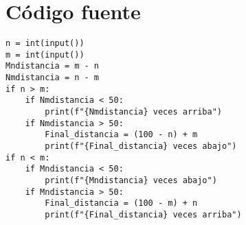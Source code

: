 \documentclass[12pt]{article}
\begin{document}
\section*{Código fuente}

\begin{verbatim}
n = int(input())
m = int(input())
Mndistancia = m - n
Nmdistancia = n - m
if n > m:
    if Nmdistancia < 50:
        print(f"{Nmdistancia} veces arriba")
    if Nmdistancia > 50:
        Final_distancia = (100 - n) + m
        print(f"{Final_distancia} veces abajo")
if n < m:
    if Mndistancia < 50:
        print(f"{Mndistancia} veces abajo")
    if Mndistancia > 50:
        Final_distancia = (100 - m) + n
        print(f"{Final_distancia} veces arriba")
\end{verbatim}
\end{document}
